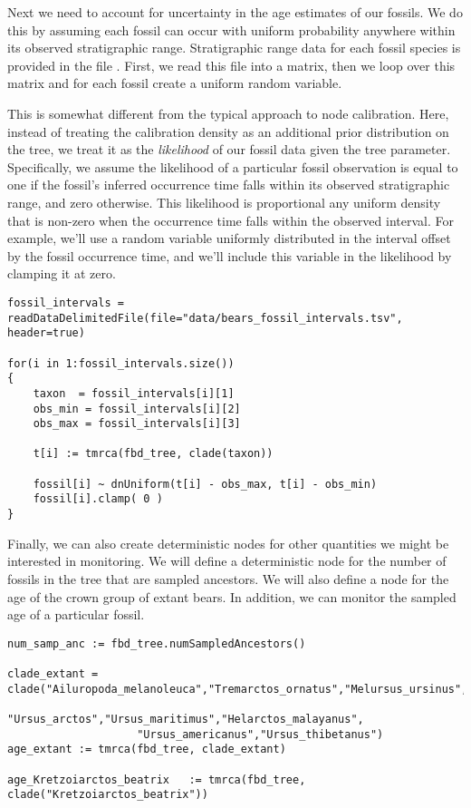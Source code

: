 Next we need to account for uncertainty in the age estimates of our fossils.
We do this by assuming each fossil can occur with uniform probability anywhere within its observed stratigraphic range.
Stratigraphic range data for each fossil species is provided in the file .
First, we read this file into a matrix, then we loop over this matrix and for each fossil create a uniform random variable.

This is somewhat different from the typical approach to node calibration.
Here, instead of treating the calibration density as an additional prior distribution on the tree, we treat it as the \textit{likelihood} of our fossil data given the tree parameter.
Specifically, we assume the likelihood of a particular fossil observation is equal to one if the fossil's inferred occurrence time falls within its observed stratigraphic range, and zero otherwise.
This likelihood is proportional any uniform density that is non-zero when the occurrence time falls within the observed interval.
For example, we'll use a random variable uniformly distributed in the interval offset by the fossil occurrence time, and we'll include this variable in the likelihood by clamping it at zero.

{\tt \begin{snugshade*}
\begin{lstlisting}
fossil_intervals = readDataDelimitedFile(file="data/bears_fossil_intervals.tsv", header=true)

for(i in 1:fossil_intervals.size())
{
    taxon  = fossil_intervals[i][1]
    obs_min = fossil_intervals[i][2]
    obs_max = fossil_intervals[i][3]
    
    t[i] := tmrca(fbd_tree, clade(taxon))
        
    fossil[i] ~ dnUniform(t[i] - obs_max, t[i] - obs_min)
    fossil[i].clamp( 0 )
}
\end{lstlisting}
\end{snugshade*}}

Finally, we can also create deterministic nodes for other quantities we might be interested in monitoring. 
We will define a deterministic node for the number of fossils in the tree that are sampled ancestors. 
We will also define a node for the age of the crown group of extant bears.
In addition, we can monitor the sampled age of a particular fossil.

{\tt \begin{snugshade*}
\begin{lstlisting}
num_samp_anc := fbd_tree.numSampledAncestors()

clade_extant = clade("Ailuropoda_melanoleuca","Tremarctos_ornatus","Melursus_ursinus",
                    "Ursus_arctos","Ursus_maritimus","Helarctos_malayanus",
                    "Ursus_americanus","Ursus_thibetanus")
age_extant := tmrca(fbd_tree, clade_extant)

age_Kretzoiarctos_beatrix   := tmrca(fbd_tree, clade("Kretzoiarctos_beatrix"))
\end{lstlisting}
\end{snugshade*}}

